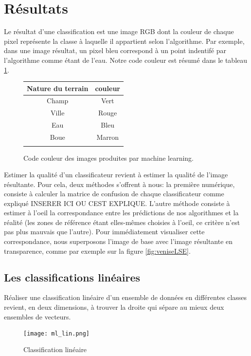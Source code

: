 \documentclass[a4paper,10pt]{report}
\begin{document}
\section{Résultats}
Le résultat d'une classification est une image RGB dont la couleur de chaque pixel représente la classe à laquelle il appartient selon l'algorithme. Par exemple, dans une image résultat, un pixel bleu correspond à un point indentifé par l'algorithme comme étant de l'eau. Notre code couleur est résumé dans le tableau \ref{table:codeCouleur}.
\begin{figure}
 \begin{center}
  \begin{tabular}{|c|c|}
    \hline
    Nature du terrain & couleur \\
    \hline
  Champ & Vert \\
  Ville &  Rouge \\
  Eau &  Bleu \\
  Boue & Marron \\
    \hline
  \label{table:codeCouleur}
  \end{tabular}
\caption{Code couleur des images produites par machine learning.} 
\end{center}
\end{figure}
Estimer la qualité d'un classificateur revient à estimer la qualité de l'image résultante. Pour cela, deux méthodes s'offrent à nous: la première numérique, consiste à calculer la matrice de confusion de chaque classificateur comme expliqué INSERER ICI OU CEST EXPLIQUE. L'autre méthode consiste à estimer à l'oeil la correspondance entre les prédictions de nos algorithmes et la réalité (les zones de référence étant elles-mêmes choisies à l'oeil, ce critère n'est pas plus mauvais que l'autre). Pour immédiatement visualiser cette correspondance, nous superposons l'image de base avec l'image résultante en transparence, comme par exemple sur la figure \ref{fig:veniseLSE}.

 \subsection{Les classifications linéaires}
 
 Réaliser une classification linéaire d'un ensemble de données en différentes classes revient, en deux dimensions, à trouver la droite qui sépare au mieux deux ensembles de vecteurs.

\begin{figure}
  \centering
    \texttt{[image: ml\_lin.png]}
  \caption{Classification linéaire}
  \label{fig:LSE}
\end{figure}
\end{document}
